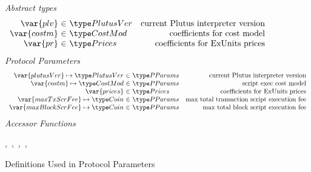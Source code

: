 \begin{figure*}[htb]
  \emph{Abstract types}
  \begin{equation*}
    \begin{array}{r@{~\in~}lr}
      \var{plv} & \PlutusVer & \text{current Plutus interpreter version}\\
      \var{costm} & \CostMod & \text{coefficients for cost model} \\
      \var{pr} & \Prices & \text{coefficients for ExUnits prices} \\
    \end{array}
  \end{equation*}
  \emph{Protocol Parameters}
  \begin{equation*}
      \begin{array}{r@{~\in~}lr}
        \var{plutusVer} \mapsto \PlutusVer & \PParams & \text{current Plutus interpreter version}\\
        \var{costm} \mapsto \CostMod & \PParams & \text{script exec cost model}\\
        \var{prices} & \Prices & \text{coefficients for ExUnits prices} \\
        \var{maxTxScrFee} \mapsto \Coin & \PParams & \text{max total transaction script execution fee}\\
        \var{maxBlockScrFee} \mapsto \Coin & \PParams & \text{max total block script execution fee}\\
      \end{array}
  \end{equation*}
  \emph{Accessor Functions}
  \begin{center}
  ,~,~,~,~
  \end{center}
  \caption{Definitions Used in Protocol Parameters}
  \label{fig:defs:protocol-parameters}
\end{figure*}


\clearpage
